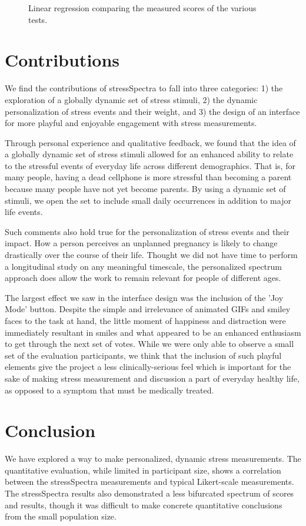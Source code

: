 \documentclass{sigchi}
\begin{document}
\begin{figure}[h!]
\caption{Linear regression comparing the measured scores of the various tests.}
\label{fig:evalreg}
\end{figure}





\section{Contributions}
We find the contributions of stressSpectra to fall into three categories: 1) the exploration of a globally dynamic set of stress stimuli, 2) the dynamic personalization of stress events and their weight, and 3) the design of an interface for more playful and enjoyable engagement with stress measurements.

Through personal experience and qualitative feedback, we found that the idea of a globally dynamic set of stress stimuli allowed for an enhanced ability to relate to the stressful events of everyday life across different demographics. That is, for many people, having a dead cellphone is more stressful than becoming a parent because many people have not yet become parents. By using a dynamic set of stimuli, we open the set to include small daily occurrences in addition to major life events. 

Such comments also hold true for the personalization of stress events and their impact. How a person perceives an unplanned pregnancy is likely to change drastically over the course of their life. Thought we did not have time to perform a longitudinal study on any meaningful timescale, the personalized spectrum approach does allow the work to remain relevant for people of different ages. 

The largest effect we saw in the interface design was the inclusion of the 'Joy Mode' button. Despite the simple and irrelevance of animated GIFs and smiley faces to the task at hand, the little moment of happiness and distraction were immediately resultant in smiles and what appeared to be an enhanced enthusiasm to get through the next set of votes. While we were only able to observe a small set of the evaluation participants, we think that the inclusion of such playful elements give the project a less clinically-serious feel which is important for the sake of making stress measurement and discussion a part of everyday healthy life, as opposed to a symptom that must be medically treated. 

\section{Conclusion}
We have explored a way to make personalized, dynamic stress measurements. The quantitative evaluation, while limited in participant size, shows a correlation between the stressSpectra measurements and typical Likert-scale measurements. The stressSpectra results also demonstrated a less bifurcated spectrum of scores and results, though it was difficult to make concrete quantitative conclusions from the small population size.
\end{document}
